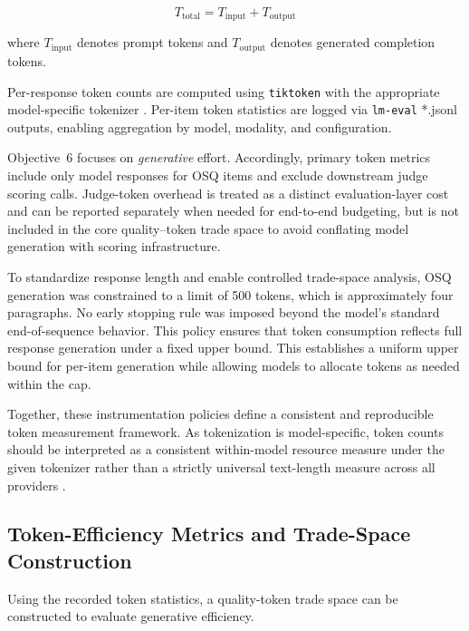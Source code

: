 \[
T_{\text{total}} = T_{\text{input}} + T_{\text{output}}
\]

where $T_{\text{input}}$ denotes prompt tokens and $T_{\text{output}}$ denotes generated completion tokens.

Per-response token counts are computed using \texttt{tiktoken} with the appropriate model-specific tokenizer \cite{openai_Tiktoken_2026}. Per-item token statistics are logged via \texttt{lm-eval} *.jsonl outputs, enabling aggregation by model, modality, and configuration.

Objective~6 focuses on \emph{generative} effort. Accordingly, primary token metrics include only model responses for OSQ items  and exclude downstream judge scoring calls. Judge-token overhead is treated as a distinct evaluation-layer cost and can be reported separately when needed for end-to-end budgeting, but is not included in the core quality--token trade space to avoid conflating model generation with scoring infrastructure.

To standardize response length and enable controlled trade-space analysis, OSQ generation was constrained to a limit of 500 tokens, which is approximately four paragraphs. No early stopping rule was imposed beyond the model’s standard end-of-sequence behavior. This policy ensures that token consumption reflects full response generation under a fixed upper bound. This establishes a uniform upper bound for per-item generation while allowing models to allocate tokens as needed within the cap.

Together, these instrumentation policies define a consistent and reproducible token measurement framework. As tokenization is model-specific, token counts should be interpreted as a consistent within-model resource measure under the given tokenizer rather than a strictly universal text-length measure across all providers \cite{openai_Tiktoken_2026, huggingface_SummaryTokenizers_2026,sennrich_NeuralMachineTranslation_2016, mielke_WordsCharactersBrief_2021, kudo_SentencePieceSimpleLanguage_2018, kudo_SubwordRegularizationImproving_2018}. 

\subsection{Token-Efficiency Metrics and Trade-Space Construction}
\label{subsec:ch3_obj6_trade_space}

Using the recorded token statistics, a quality-token trade space can be constructed to evaluate generative efficiency.

